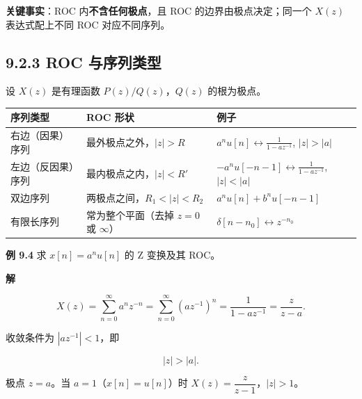 \textbf{关键事实}：ROC 内\textbf{不含任何极点}，且 ROC
的边界由极点决定；同一个 \(X(z)\) 表达式配上不同 ROC 对应不同序列。

\subsection{9.2.3 ROC
与序列类型}\label{roc-ux4e0eux5e8fux5217ux7c7bux578b}

设 \(X(z)\) 是有理函数 \(P(z)/Q(z)\)，\(Q(z)\) 的根为极点。

{\def\LTcaptype{none} %
\begin{longtable}[]{@{}
  >{\raggedright\arraybackslash}p{}
  >{\raggedright\arraybackslash}p{}
  >{\raggedright\arraybackslash}p{}@{}}
\toprule\noalign{}
\begin{minipage}[b]{\linewidth}\raggedright
序列类型
\end{minipage} & \begin{minipage}[b]{\linewidth}\raggedright
ROC 形状
\end{minipage} & \begin{minipage}[b]{\linewidth}\raggedright
例子
\end{minipage} \\
\midrule\noalign{}
\endhead
\bottomrule\noalign{}
\endlastfoot
右边（因果）序列 & 最外极点之外，\(|z|>R\) &
\(a^n u[n] \leftrightarrow \frac{1}{1-az^{-1}}\), \(|z|>|a|\) \\
左边（反因果）序列 & 最内极点之内，\(|z|<R'\) &
\(-a^n u[-n-1] \leftrightarrow \frac{1}{1-az^{-1}}\), \(|z|<|a|\) \\
双边序列 & 两极点之间，\(R_1<|z|<R_2\) & \(a^n u[n]+b^n u[-n-1]\) \\
有限长序列 & 常为整个平面（去掉 \(z=0\) 或 \(\infty\)） &
\(\delta[n-n_0] \leftrightarrow z^{-n_0}\) \\
\end{longtable}
}

\textbf{例 9.4} 求 \(x[n]=a^n u[n]\) 的 Z 变换及其 ROC。

\textbf{解}

\[
X(z)=\sum_{n=0}^{\infty}a^n z^{-n}=\sum_{n=0}^{\infty}(a z^{-1})^n=\frac{1}{1-a z^{-1}}=\frac{z}{z-a}.
\]

收敛条件为 \(|a z^{-1}|<1\)，即

\[
|z|>|a| .
\]

极点 \(z=a\)。当 \(a=1\)（\(x[n]=u[n]\)）时
\(X(z)=\dfrac{z}{z-1}\)，\(|z|>1\)。

